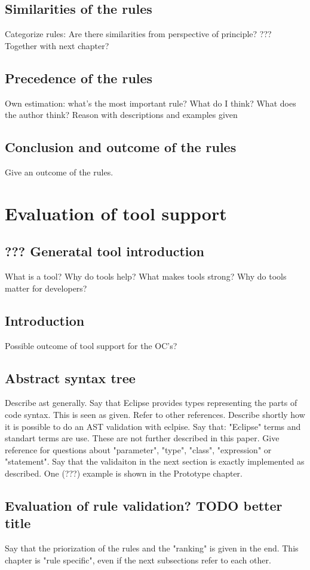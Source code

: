 \section{Similarities of the rules}
Categorize rules: Are there similarities from perspective of principle? ??? Together with next chapter?
\section{Precedence of the rules}
Own estimation: what's the most important rule? What do I think? What does the author think? Reason with descriptions and examples given
\section{Conclusion and outcome of the rules}
Give an outcome of the rules.

\chapter{Evaluation of tool support}
\section{??? Generatal tool introduction}
What is a tool? Why do tools help? What makes tools strong? Why do tools matter for developers?
\section{Introduction}
Possible outcome of tool support for the OC's?
\section{Abstract syntax tree}
Describe ast generally. Say that Eclipse provides types representing the parts of code syntax. This is seen as given. 
Refer to other references.
Describe shortly how it is possible to do an AST validation with eclpise. Say that: "Eclipse" terms and standart terms are use. These are not further described in this paper. Give reference for questions about "parameter", "type", "class", "expression" or "statement".
Say that the validaiton in the next section is exactly implemented as described. One (???) example is shown in the Prototype chapter.
\section{Evaluation of rule validation? TODO better title}
Say that the priorization of the rules and the "ranking" is given in the end. This chapter is "rule specific", even if the next subsections refer to each other.


